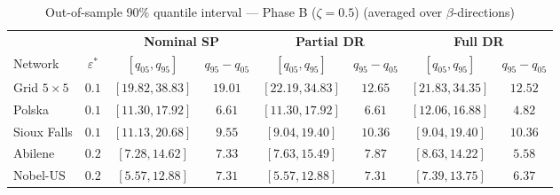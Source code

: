 \begin{table}[htbp]
\centering
\caption{Out-of-sample 90\% quantile interval — Phase B ($\zeta=0.5$) (averaged over $\beta$-directions)}
\label{tab:oos-zeta05}
\small
\setlength{\tabcolsep}{6pt}
\begin{tabular}{l c cc cc cc}
\toprule
& & \multicolumn{2}{c}{\textbf{Nominal SP}} & \multicolumn{2}{c}{\textbf{Partial DR}} & \multicolumn{2}{c}{\textbf{Full DR}} \\
\cmidrule(lr){3-4} \cmidrule(lr){5-6} \cmidrule(lr){7-8}
Network & $\varepsilon^{*}$ & $[q_{05}, q_{95}]$ & $q_{95} \!-\! q_{05}$ & $[q_{05}, q_{95}]$ & $q_{95} \!-\! q_{05}$ & $[q_{05}, q_{95}]$ & $q_{95} \!-\! q_{05}$ \\
\midrule
Grid $5 \times 5$ & $0.1$ & $[19.82, 38.83]$ & $19.01$ & $[22.19, 34.83]$ & $12.65$ & $[21.83, \mathbf{34.35}]$ & $\mathbf{12.52}$ \\
Polska & $0.1$ & $[11.30, 17.92]$ & $6.61$ & $[11.30, 17.92]$ & $6.61$ & $[12.06, \mathbf{16.88}]$ & $\mathbf{4.82}$ \\
Sioux Falls & $0.1$ & $[11.13, 20.68]$ & $\mathbf{9.55}$ & $[9.04, \mathbf{19.40}]$ & $10.36$ & $[9.04, \mathbf{19.40}]$ & $10.36$ \\
Abilene & $0.2$ & $[7.28, 14.62]$ & $7.33$ & $[7.63, 15.49]$ & $7.87$ & $[8.63, \mathbf{14.22}]$ & $\mathbf{5.58}$ \\
Nobel-US & $0.2$ & $[5.57, \mathbf{12.88}]$ & $7.31$ & $[5.57, \mathbf{12.88}]$ & $7.31$ & $[7.39, 13.75]$ & $\mathbf{6.37}$ \\
\bottomrule
\end{tabular}
\end{table}


